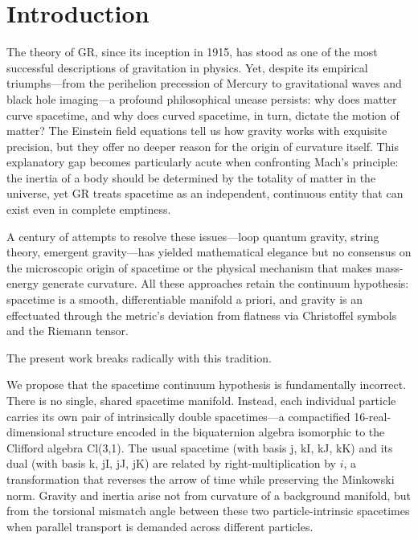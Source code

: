 \documentclass[dvipdfmx,a4paper]{article}
\begin{document}
\section{Introduction}
\label{sec:introduction}

The theory of GR, since its inception in 1915, has stood as one of the most successful descriptions of gravitation in physics. Yet, despite its empirical triumphs—from the perihelion precession of Mercury to gravitational waves and black hole imaging—a profound philosophical unease persists: why does matter curve spacetime, and why does curved spacetime, in turn, dictate the motion of matter? The Einstein field equations tell us how gravity works with exquisite precision, but they offer no deeper reason for the origin of curvature itself. This explanatory gap becomes particularly acute when confronting Mach's principle: the inertia of a body should be determined by the totality of matter in the universe, yet GR treats spacetime as an independent, continuous entity that can exist even in complete emptiness.

A century of attempts to resolve these issues—loop quantum gravity, string theory, emergent gravity—has yielded mathematical elegance but no consensus on the microscopic origin of spacetime or the physical mechanism that makes mass-energy generate curvature. All these approaches retain the continuum hypothesis: spacetime is a smooth, differentiable manifold a priori, and gravity is an effectuated through the metric's deviation from flatness via Christoffel symbols and the Riemann tensor.

The present work breaks radically with this tradition.

We propose that the spacetime continuum hypothesis is fundamentally incorrect. There is no single, shared spacetime manifold. Instead, each individual particle carries its own pair of intrinsically double spacetimes—a compactified 16-real-dimensional structure encoded in the biquaternion algebra isomorphic to the Clifford algebra Cl(3,1). The usual spacetime (with basis j, kI, kJ, kK) and its dual (with basis k, jI, jJ, jK) are related by right-multiplication by $i$, a transformation that reverses the arrow of time while preserving the Minkowski norm. Gravity and inertia arise not from curvature of a background manifold, but from the torsional mismatch angle between these two particle-intrinsic spacetimes when parallel transport is demanded across different particles.
\end{document}

